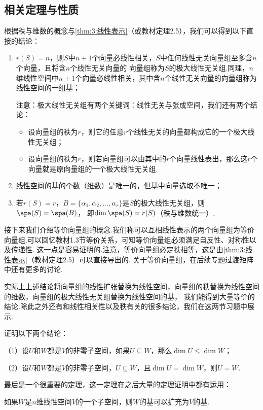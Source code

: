 \subsection{相关定理与性质}
根据秩与维数的概念与\autoref{thm:3:线性表示}（或教材定理2.5），我们可以得到以下直接的结论：
\begin{enumerate}
    \item $r(S)=n$，则$S$中$n+1$个向量必线性相关，$S$中任何线性无关向量组至多含$n$个向量，且将含$n$个线性无关向量的
    向量组称为$S$的极大线性无关组.同理，$n$维线性空间中$n+1$个向量必线性相关，其中含$n$个线性无关向量的向量组称为
    线性空间的一组基；

    注意：极大线性无关组有两个关键词：线性无关与张成空间，我们还有两个结论：
    \begin{itemize}
        \item 设向量组的秩为$r$，则它的任意$r$个线性无关的向量都构成它的一个极大线性无关组；
        \item 设向量组的秩为$r$，则若向量组可以由其中的$r$个向量线性表出，那么这$r$个向量就是原向量组的一个极大线性无关组.
    \end{itemize}

    \item 线性空间的基的个数（维数）是唯一的，但基中向量选取不唯一；

    \item 若$r(S)=r$，$B=\{\alpha_1,\alpha_2,\ldots,\alpha_r\}$是$S$的极大线性无关组，则$\spa(S)=\spa(B)$，
          即$\dim \spa(S)=r(S)$（秩与维数统一）.
\end{enumerate}
接下来我们介绍等价向量组的概念.我们称可以互相线性表示的两个向量组为等价向量组.可以回忆教材1.3节等价关系，可知等价向量组必须满足自反性、对称性以及传递性.
这一点是容易证明的.注意，等价向量组必定秩相等，这是由\autoref{thm:3:线性表示}（教材定理2.5）可以直接导出的.
关于等价向量组，在后续专题过渡矩阵中还有更多的讨论.

实际上上述结论将向量组的线性扩张替换为线性空间，向量组的秩替换为线性空间的维数，向量组的极大线性无关组替换为线性空间的基，
我们能得到大量等价的结论.除此之外还有和线性相关性以及秩有关的很多结论，我们在这两节习题中展示.
\begin{example}
	证明以下两个结论：

	\textup{（1）}设$U$和$W$都是$V$的非零子空间，如果$U\subseteq W$，那么$\dim U \leqslant \dim W$；

	\textup{（2）}设$U$和$W$都是$V$的非零子空间，$U\subseteq W$，且$\dim U = \dim W$，则$U = W$.
\end{example}
最后是一个很重要的定理，这一定理在之后大量的定理证明中都有运用：
\begin{theorem}
	如果$W$是$n$维线性空间$V$的一个子空间，则$W$的基可以扩充为$V$的基.
\end{theorem}

